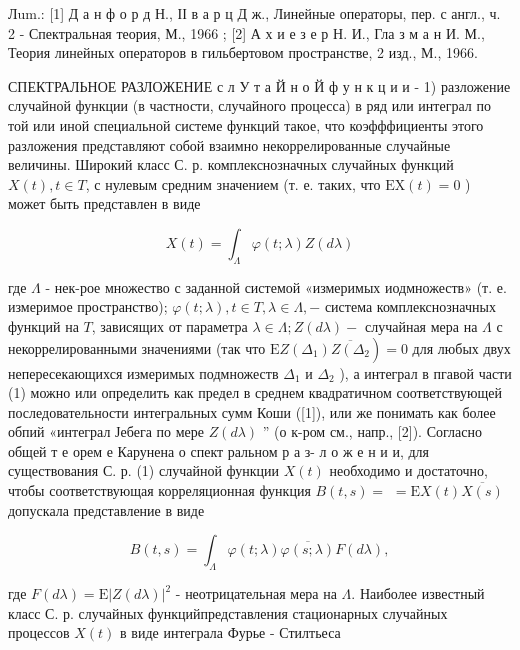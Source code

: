 \documentclass[10pt]{article}
\begin{document}
Лum.: [1] Д а н ф о р д Н., ІІ в а р ц Д ж., Линейные операторы, пер. с англ., ч. 2 - Спектральная теория, М., 1966 ; [2] А х и е з е р Н. И., Гла з м а н И. М., Теория линейных операторов в гильбертовом пространстве, 2 изд., М., 1966.



СПЕКТРАЛЬНОЕ РАЗЛОЖЕНИЕ с л У т а Й н о Й ф у н к ц и и - 1) разложение случайной функции (в частности, случайного процесса) в ряд или интеграл по той или иной специальной системе функций такое, что коэфффициенты этого разложения представляют собой взаимно некоррелированные случайные величины. Широкий класс С. р. комплекснозначных случайных функций $X(t), t \in T$, с нулевым средним значением (т. е. таких, что $\mathrm{EX}(t)=0$ ) может быть представлен в виде



\[

X(t)=\int_{\Lambda} \varphi(t ; \lambda) Z(d \lambda)

\]



где $\Lambda$ - нек-рое множество с заданной системой «измеримых иодмножеств» (т. е. измеримое пространство); $\varphi(t ; \lambda), t \in T, \lambda \in \Lambda,-$ система комплекснозначных функций на $T$, зависящих от параметра $\lambda \in \Lambda ; Z(d \lambda)-$ случайная мера на $\Lambda$ с некоррелированными значениями (так что $\left.\mathrm{E} Z\left(\Delta_{1}\right) \overline{Z\left(\Delta_{2}\right.}\right)=0$ для любых двух непересекающихся измеримых подмножеств $\Delta_{1}$ и $\Delta_{2}$ ), а интеграл в пгавой части (1) можно или определить как предел в среднем квадратичном соответствующей последовательности интегральных сумм Коши ([1]), или же понимать как более обпий «интеграл Јебега по мере $Z(d \lambda)$ ” (о к-ром см., напр., [2]). Согласно общей т е орем е Карунена о спект ральном р а з- л о ж е н и и, для существования С. р. (1) случайной функции $X(t)$ необходимо и достаточно, чтобы соответствующая корреляционная функция $B(t, s)=$ $=\mathrm{E} X(t) \overline{X(s)}$ допускала представление в виде



\[

B(t, s)=\int_{\Lambda} \varphi(t ; \lambda) \overline{\varphi(s ; \lambda)} F(d \lambda),

\]



где $F(d \lambda)=\mathrm{E}|Z(d \lambda)|^{2}$ - неотрицательная мера на $\Lambda$. Наиболее известный класс С. р. случайных функцийпредставления стационарных случайных процессов $X(t)$ в виде интеграла Фурье - Стилтьеса
\end{document}
